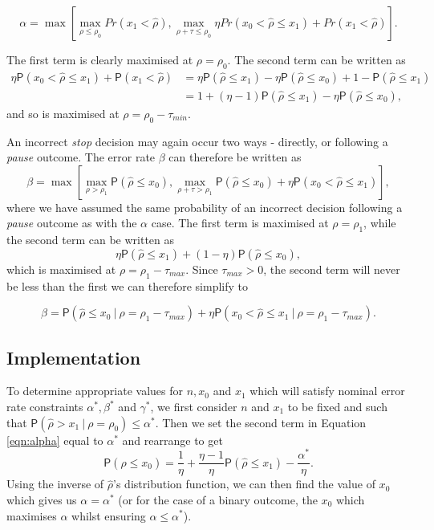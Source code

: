 \documentclass{bmcart}
\newcommand{\PR}{{\mathsf P}}
\begin{document}
\begin{equation}\label{eqn:alpha}
\alpha = \max \left[ \max_{\rho \leq \rho_0} Pr(x_1 < \hat{\rho}), \max_{\rho + \tau \leq \rho_0} \eta Pr(x_0 < \hat{\rho} \leq x_1) + Pr(x_1 < \hat{\rho}) \right].
\end{equation}

The first term is clearly maximised at $\rho = \rho_0$. The second term can be written as
$$
\begin{aligned}
\eta \PR(x_0 < \hat{\rho} \leq x_1) + \PR(x_1 < \hat{\rho}) &=
\eta \PR(\hat{\rho} \leq x_1) - \eta \PR(\hat{\rho} \leq x_0) + 1 - \PR(\hat{\rho} \leq x_1)\\
&= 1 + (\eta - 1)\PR(\hat{\rho} \leq x_1) - \eta \PR(\hat{\rho} \leq x_0),
\end{aligned}
$$
and so is maximised at $\rho = \rho_0 - \tau_{min}$.

An incorrect \emph{stop} decision may again occur two ways - directly, or following a \emph{pause} outcome. The error rate $\beta$ can therefore be written as
$$
\beta = \max \left[ \max_{\rho > \rho_1} \PR(\hat{\rho} \leq x_0), \max_{\rho + \tau > \rho_1} \PR(\hat{\rho} \leq x_0) + \eta \PR(x_0 < \hat{\rho} \leq x_1) \right],
$$
where we have assumed the same probability of an incorrect decision following a \emph{pause} outcome as with the $\alpha$ case. The first term is maximised at $\rho = \rho_1$, while the second term can be written as
$$
\eta \PR(\hat{\rho} \leq x_1) + (1 - \eta) \PR(\hat{\rho} \leq x_0),
$$
which is maximised at $\rho = \rho_1 - \tau_{max}$. Since $\tau_{max} > 0$, the second term will never be less than the first we can therefore simplify to

\begin{equation}\label{eqn:beta}
\beta = \PR(\hat{\rho} \leq x_0 ~|~ \rho = \rho_1 - \tau_{max}) + \eta \PR(x_0 < \hat{\rho} \leq x_1 ~|~ \rho = \rho_1 - \tau_{max}).
\end{equation}

\subsection{Implementation}

To determine appropriate values for $n, x_0$ and $x_1$ which will satisfy nominal error rate constraints $\alpha^*, \beta^*$ and $\gamma^*$, we first consider $n$ and $x_1$ to be fixed and such that $\PR(\hat{\rho} > x_1 ~|~ \rho = \rho_0) \leq \alpha^*$. Then we set the second term in Equation \ref{eqn:alpha} equal to $\alpha^*$ and rearrange to get
$$
\PR(\hat{\rho} \leq x_0) = \frac{1}{\eta} + \frac{\eta - 1}{\eta}\PR(\hat{\rho} \leq x_1) - \frac{\alpha^*}{\eta}.
$$
Using the inverse of $\hat{\rho}$'s distribution function, we can then find the value of $x_0$ which gives us $\alpha = \alpha^*$ (or for the case of a binary outcome, the $x_0$ which maximises $\alpha$ whilst ensuring $\alpha \leq \alpha^*$).
\end{document}
